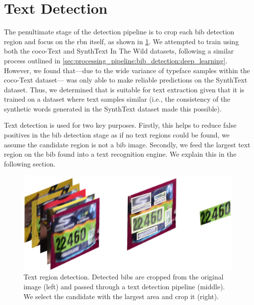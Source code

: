 \section{Text Detection}

The penultimate stage of the detection pipeline is to crop each bib detection region and focus on the \gls{rbn} itself, as shown in \cref{fig:processing_pipeline:text_detection}. We attempted to train \frcnn{} using both the \gls{coco}-Text \citep{Veit:2016vj} and SynthText In The Wild \citep{Gupta:2016ws} datasets, following a similar process outlined in \cref{sec:processing_pipeline:bib_detection:deep_learning}. However, we found that---due to the wide variance of typeface samples within the \gls{coco}-Text dataset---\frcnn{} was only able to make reliable predictions on the SynthText dataset. Thus, we determined that \frcnn{} is suitable for text extraction given that it is trained on a dataset where text samples similar (i.e., the consistency of the synthetic words generated in the SynthText dataset made this possible).

Text detection is used for two key purposes. Firstly, this helps to reduce false positives in the bib detection stage as if no text regions could be found, we assume the candidate region is not a bib image. Secondly, we feed the largest text region on the bib found into a text recognition engine. We explain this in the following section.

\begin{figure}[h]
  \centering
  \includegraphics[width=\textwidth]{images/processing/text_process}
  \caption[Text region detection pipeline]{Text region detection. Detected bibs are cropped from the original image (left) and passed through a text detection pipeline (middle). We select the candidate with the largest area and crop it (right).}
  \label{fig:processing_pipeline:text_detection}
\end{figure}

